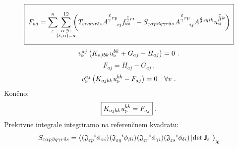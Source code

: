 \vspace{1mm}
\begin{equation}
   \boxed{ \phantom{\rule[-9mm]{1mm}{18mm}}
   F_{a j} =
   \sum^n_\varepsilon
   \mkern-7mu
   \sum_{\substack{\alpha \, \ni: \\ (\varepsilon,\alpha) = a}}^{12}
   \mkern-10mu
   \qty(
      T_{\varepsilon   \alpha p   \gamma r   \delta s}
   A^{\substack{\mkern2mu \varepsilon \\[0.12mm] \gamma} \mkern2mu r p}_{\mkern29mu i j}
   f^{\substack{\mkern2mu \varepsilon \\[-0.59mm] \gamma} \mkern2mu r i}_{\bowtie}
   -
   S_{\varepsilon   \alpha p   \beta q   \gamma r   \delta s} \mkern2mu
   A^{\substack{\mkern2mu \varepsilon \\[0.12mm] \gamma} \mkern2mu r p}_{\mkern29mu i j}
   A^{\substack{\mkern2mu \varepsilon \\[-0.59mm] \delta} \mkern2mu s q i k}
   u^{\substack{\mkern2mu \varepsilon \\[0.14mm] \beta} \mkern2mu k}_\triangleleft ) \mkern3mu }
\end{equation}
\begin{equation*}
   v^{a j}_{\triangleright} \left(
   K_{a j b k} \mkern1mu u^{b k}_\triangleright
   +
   G_{a j}
   -
   H_{a j}
   \right) = 0 \ .
\end{equation*}
\begin{equation*}
   F_{a j} = H_{a j} - G_{a j} \ .
\end{equation*}
\begin{equation*}
   v^{a j}_{\triangleright} \left(
   K_{a j b k} \mkern1mu u^{b k}_\triangleright
   -
   F_{a j}
   \right) = 0 \quad \forall v \ .
\end{equation*}
Končno:
\begin{equation}
   \boxed{
   K_{a j b k} \mkern1mu u^{b k}_\triangleright
   =
   F_{a j} } \ .
\end{equation}
Prekrivne integrale integriramo na referenčnem kvadratu:
\begin{equation}
   S_{\varepsilon  \alpha p \beta q \gamma r \delta s}
   =
   \expval{
      ( \mathfrak{J}_{\varepsilon p}^{\mkern18mu i} \phi_{\alpha i}) \mkern1mu
      ( \mathfrak{J}_{\varepsilon q}^{\mkern18mu i} \phi_{\beta i} ) \mkern1mu
      ( \mathfrak{J}_{\varepsilon r}^{\mkern18mu i} \phi_{\gamma i})
      ( \mathfrak{J}_{\varepsilon s}^{\mkern18mu i} \phi_{\mkern-1mu \delta i} ) \mkern2mu
      |\mkern-2mu \det \bm{\mathsf{J}}_\varepsilon | }_{\bm{\chi}}
\end{equation}
